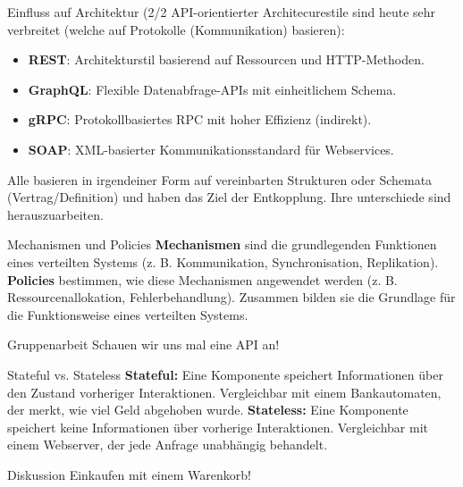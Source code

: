 \documentclass{beamer}
\begin{document}
\begin{frame}{Einfluss auf Architektur  (2/2}
   API-orientierter Architecurestile sind heute sehr verbreitet (welche auf Protokolle (Kommunikation) basieren):
\begin{itemize}
    \item \textbf{REST}: Architekturstil basierend auf Ressourcen und HTTP-Methoden.
    \item \textbf{GraphQL}: Flexible Datenabfrage-APIs mit einheitlichem Schema.
    \item \textbf{gRPC}: Protokollbasiertes RPC mit hoher Effizienz (indirekt).
    \item \textbf{SOAP}: XML-basierter Kommunikationsstandard für Webservices.
\end{itemize}
 Alle basieren in irgendeiner Form auf vereinbarten Strukturen oder Schemata (Vertrag/Definition) und haben das Ziel der Entkopplung. Ihre unterschiede sind herauszuarbeiten.
\end{frame}

\begin{frame}{Mechanismen und Policies}
    \textbf{Mechanismen} sind die grundlegenden Funktionen eines verteilten Systems (z. B. Kommunikation, Synchronisation, Replikation). \newline
    \textbf{Policies} bestimmen, wie diese Mechanismen angewendet werden (z. B. Ressourcenallokation, Fehlerbehandlung). Zusammen bilden sie die Grundlage für die Funktionsweise eines verteilten Systems.
\end{frame}

\begin{frame}{Gruppenarbeit}
    Schauen wir uns mal eine API an!
\end{frame}

\begin{frame}{Stateful vs. Stateless}
    \textbf{Stateful:} Eine Komponente speichert Informationen über den Zustand vorheriger Interaktionen. Vergleichbar mit einem Bankautomaten, der merkt, wie viel Geld abgehoben wurde. \newline
    \textbf{Stateless:} Eine Komponente speichert keine Informationen über vorherige Interaktionen. Vergleichbar mit einem Webserver, der jede Anfrage unabhängig behandelt.
\end{frame}

\begin{frame}{Diskussion}
    Einkaufen mit einem Warenkorb!
\end{frame}
\end{document}
